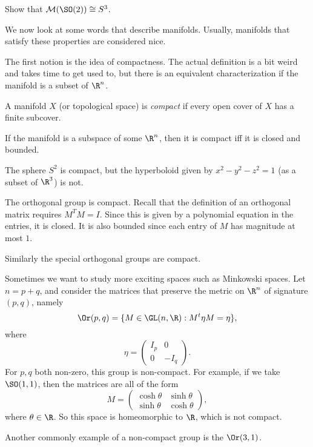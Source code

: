\documentclass[a4paper]{article}
\begin{document}
\begin{ex}
  Show that $\mathcal{M}(\SO(2)) \cong S^3$.
\end{ex}

We now look at some words that describe manifolds. Usually, manifolds that satisfy these properties are considered nice.

The first notion is the idea of compactness. The actual definition is a bit weird and takes time to get used to, but there is an equivalent characterization if the manifold is a subset of $\R^n$.
\begin{defi}[Compact]
  A manifold $X$ (or topological space) is \emph{compact} if every open cover of $X$ has a finite subcover.

  If the manifold is a subspace of some $\R^n$, then it is compact iff it is closed and bounded.
\end{defi}

\begin{eg}
  The sphere $S^2$ is compact, but the hyperboloid given by $x^2 - y^2 - z^2 = 1$ (as a subset of $\R^3$) is not.
\end{eg}

\begin{eg}
  The orthogonal group is compact. Recall that the definition of an orthogonal matrix requires $M^T M = I$. Since this is given by a polynomial equation in the entries, it is closed. It is also bounded since each entry of $M$ has magnitude at most $1$.

  Similarly the special orthogonal groups are compact.
\end{eg}

\begin{eg}
  Sometimes we want to study more exciting spaces such as Minkowski spaces. Let $n = p + q$, and consider the matrices that preserve the metric on $\R^n$ of signature $(p, q)$, namely
  \[
    \Or(p, q) = \{M \in \GL(n, \R): M^t \eta M = \eta\},
  \]
  where
  \[
    \eta =
    \begin{pmatrix}
      I_p & 0\\
      0 & -I_q
    \end{pmatrix}.
  \]
  For $p, q$ both non-zero, this group is non-compact. For example, if we take $\SO(1, 1)$, then the matrices are all of the form
  \[
    M =
    \begin{pmatrix}
      \cosh\theta & \sinh \theta\\
      \sinh \theta & \cosh \theta
    \end{pmatrix},
  \]
  where $\theta \in \R$. So this space is homeomorphic to $\R$, which is not compact.

  Another commonly example of a non-compact group is the  $\Or(3, 1)$.
\end{eg}
\end{document}
